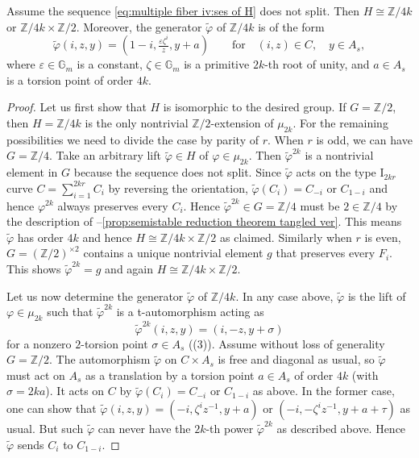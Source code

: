 \documentclass[reqno, letterpaper]{amsart}
\numberwithin{equation}{subsection}
\newcommand{\GG}{\mathbb{G}}
\newcommand{\ZZ}{\mathbb{Z}}
\begin{document}
			\begin{lemma} \label{lem:multiple fiber iv:non-split H}
				Assume the sequence \eqref{eq:multiple fiber iv:ses of H} does not split. Then $H \cong \ZZ/4k$ or $\ZZ/4k \times \ZZ/2$. Moreover, the generator $\tilde \varphi$ of $\ZZ/4k$ is of the form
				\[ \tilde \varphi(i,z,y) = (1-i, \tfrac{\varepsilon \zeta^i}{z}, y+a) \qquad\mbox{for}\quad (i,z) \in C , \quad y \in A_s ,\]
				where $\varepsilon \in \GG_m$ is a constant, $\zeta \in \GG_m$ is a primitive $2k$-th root of unity, and $a \in A_s$ is a torsion point of order $4k$.
			\end{lemma}
			\begin{proof}
				Let us first show that $H$ is isomorphic to the desired group. If $G = \ZZ/2$, then $H = \ZZ/4k$ is the only nontrivial $\ZZ/2$-extension of $\mu_{2k}$. For the remaining possibilities we need to divide the case by parity of $r$. When $r$ is odd, we can have $G = \ZZ/4$. Take an arbitrary lift $\tilde \varphi \in H$ of $\varphi \in \mu_{2k}$. Then $\tilde \varphi^{2k}$ is a nontrivial element in $G$ because the sequence does not split. Since $\tilde \varphi$ acts on the type $\mathrm I_{2kr}$ curve $C = \sum_{i=1}^{2kr} C_i$ by reversing the orientation, $\tilde \varphi(C_i) = C_{-i}$ or $C_{1-i}$ and hence $\varphi^{2k}$ always preserves every $C_i$. Hence $\tilde \varphi^{2k} \in G = \ZZ/4$ must be $2 \in \ZZ/4$ by the description of --\ref{prop:semistable reduction theorem tangled ver}. This means $\tilde \varphi$ has order $4k$ and hence $H \cong \ZZ/4k \times \ZZ/2$ as claimed. Similarly when $r$ is even, $G = (\ZZ/2)^{\times 2}$ contains a unique nontrivial element $g$ that preserves every $F_i$. This shows $\tilde \varphi^{2k} = g$ and again $H \cong \ZZ/4k \times \ZZ/2$.
				
				\medskip
				
				Let us now determine the generator $\tilde \varphi$ of $\ZZ/4k$. In any case above, $\tilde \varphi$ is the lift of $\varphi \in \mu_{2k}$ such that $\tilde \varphi^{2k}$ is a t-automorphism acting as
				\[ \tilde \varphi^{2k} (i,z,y) = (i,-z,y + \sigma) \]
				for a nonzero $2$-torsion point $\sigma \in A_s$ ((3)). Assume without loss of generality $G = \ZZ/2$. The automorphism $\tilde \varphi$ on $C \times A_s$ is free and diagonal as usual, so $\tilde \varphi$ must act on $A_s$ as a translation by a torsion point $a \in A_s$ of order $4k$ (with $\sigma = 2ka$). It acts on $C$ by $\tilde \varphi(C_i) = C_{-i}$ or $C_{1-i}$ as above. In the former case, one can show that $\tilde \varphi(i,z,y) = (-i, \zeta^i z^{-1}, y+a)$ or $(-i, -\zeta^i z^{-1}, y+a+\tau)$ as usual. But such $\tilde \varphi$ can never have the $2k$-th power $\tilde \varphi^{2k}$ as described above. Hence $\tilde \varphi$ sends $C_i$ to $C_{1-i}$.
				

\end{proof}
\end{document}
